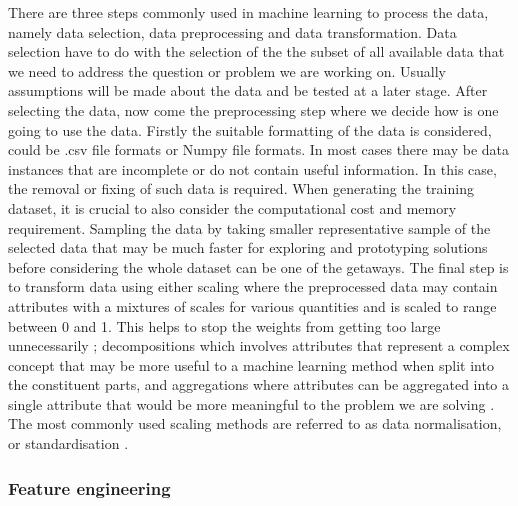 There are three steps commonly used in machine learning to process the data, namely data selection, data preprocessing  and data transformation. Data selection have to do with the selection of the the subset of all available data that we need to address the question or problem we are working on. Usually assumptions will be made  about the data and be tested at a later stage. After selecting the data, now come the preprocessing step where we decide how is one going to use the data. Firstly the suitable formatting of the data is considered, could be .csv file formats or Numpy file formats. In most cases there may be data instances that are incomplete or do not contain useful information. In this case, the removal or fixing of such data is required. When generating the training dataset, it is crucial to also consider the computational cost and memory requirement. Sampling the data by taking smaller representative sample of the selected data that may be much faster for exploring and prototyping solutions before considering the whole dataset can be one of the getaways. The final step is to transform data using either scaling where the preprocessed data may contain attributes with a mixtures of scales for various quantities and is scaled to range between 0 and 1. This helps to stop the weights from getting too large unnecessarily \citep{marsland2015machine}; decompositions which involves attributes that represent a complex concept that may be more useful to a machine learning method when split into the constituent parts, and  aggregations where attributes can be aggregated into a single attribute that would be more meaningful to the problem we are solving \citep{brownlee2013prepare}. The most commonly used scaling methods are referred to as data normalisation, or standardisation \citep{marsland2015machine}.
    
\subsubsection{Feature engineering}

